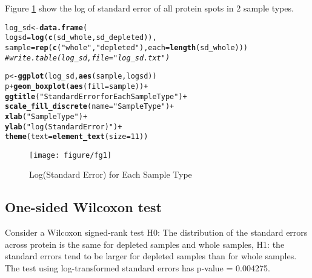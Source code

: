 \documentclass{article}\usepackage[]{graphicx}\usepackage[]{color}
\makeatletter
\def\maxwidth{ %
  \ifdim\Gin@nat@width>\linewidth
    \linewidth
  \else
    \Gin@nat@width
  \fi
}
\newcommand{\hlnum}[1]{\textcolor[rgb]{0.686,0.059,0.569}{#1}}%
\newcommand{\hlstr}[1]{\textcolor[rgb]{0.192,0.494,0.8}{#1}}%
\newcommand{\hlcom}[1]{\textcolor[rgb]{0.678,0.584,0.686}{\textit{#1}}}%
\newcommand{\hlopt}[1]{\textcolor[rgb]{0,0,0}{#1}}%
\newcommand{\hlstd}[1]{\textcolor[rgb]{0.345,0.345,0.345}{#1}}%
\newcommand{\hlkwb}[1]{\textcolor[rgb]{0.69,0.353,0.396}{#1}}%
\newcommand{\hlkwc}[1]{\textcolor[rgb]{0.333,0.667,0.333}{#1}}%
\newcommand{\hlkwd}[1]{\textcolor[rgb]{0.737,0.353,0.396}{\textbf{#1}}}%
\newenvironment{kframe}{%
 \def\at@end@of@kframe{}%
 \ifinner\ifhmode%
  \def\at@end@of@kframe{\end{minipage}}%
  \begin{minipage}{\columnwidth}%
 \fi\fi%
 \def\FrameCommand##1{\hskip\@totalleftmargin \hskip-\fboxsep
 \colorbox{shadecolor}{##1}\hskip-\fboxsep
     \hskip-\linewidth \hskip-\@totalleftmargin \hskip\columnwidth}%
 \MakeFramed {\advance\hsize-\width
   \@totalleftmargin\z@ \linewidth\hsize
   \@setminipage}}%
 {\par\unskip\endMakeFramed%
 \at@end@of@kframe}
\newenvironment{knitrout}{}{} %
\makeatother
\begin{document}
Figure \ref{fig:fg1} show the log of standard error of all protein spots in 2 sample types.

\begin{knitrout}
\color{fgcolor}\begin{kframe}
\begin{alltt}
\hlstd{log_sd} \hlkwb{<-} \hlkwd{data.frame}\hlstd{(}
  \hlkwc{logsd} \hlstd{=} \hlkwd{log}\hlstd{(}\hlkwd{c}\hlstd{(sd_whole, sd_depleted)),}
  \hlkwc{sample} \hlstd{=} \hlkwd{rep}\hlstd{(}\hlkwd{c}\hlstd{(}\hlstr{"whole"}\hlstd{,} \hlstr{"depleted"}\hlstd{),} \hlkwc{each} \hlstd{=} \hlkwd{length}\hlstd{(sd_whole)))}
\hlcom{# write.table(log_sd, file = "log_sd.txt")}

\hlstd{p} \hlkwb{<-} \hlkwd{ggplot}\hlstd{(log_sd,} \hlkwd{aes}\hlstd{(sample, logsd))}
\hlstd{p} \hlopt{+} \hlkwd{geom_boxplot}\hlstd{(}\hlkwd{aes}\hlstd{(}\hlkwc{fill} \hlstd{= sample))} \hlopt{+}
  \hlkwd{ggtitle}\hlstd{(}\hlstr{"Standard Error for Each Sample Type"}\hlstd{)} \hlopt{+}
  \hlkwd{scale_fill_discrete}\hlstd{(}\hlkwc{name}\hlstd{=} \hlstr{"Sample Type"}\hlstd{)} \hlopt{+}
  \hlkwd{xlab}\hlstd{(}\hlstr{"Sample Type"}\hlstd{)} \hlopt{+}
  \hlkwd{ylab}\hlstd{(}\hlstr{"log(Standard Error)"}\hlstd{)} \hlopt{+}
  \hlkwd{theme}\hlstd{(}\hlkwc{text} \hlstd{=} \hlkwd{element_text}\hlstd{(}\hlkwc{size}\hlstd{=}\hlnum{11}\hlstd{))}
\end{alltt}
\end{kframe}\begin{figure}[H]

\texttt{[image: figure/fg1]} \caption[Log(Standard Error) for Each Sample Type]{Log(Standard Error) for Each Sample Type\label{fig:fg1}}
\end{figure}


\end{knitrout}
\subsection{One-sided Wilcoxon test}
Consider a Wilcoxon signed-rank test H0: The distribution of the  standard errors across protein   is the same for  depleted samples and whole samples, H1: the standard errors tend to be larger for depleted samples than for whole samples.  The test using log-transformed standard errors has p-value = 0.004275. 
\end{document}
